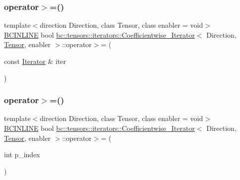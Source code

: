 \mbox{\label{structbc_1_1tensors_1_1iterators_1_1Coefficientwise__Iterator_a0030f0c39f8c92d9853d5ca7ea48d41d}} 
\subsubsection{\texorpdfstring{operator$>$=()}{operator>=()}\hspace{0.1cm}{\footnotesize\ttfamily [1/2]}}
{\footnotesize\ttfamily template$<$direction Direction, class Tensor, class enabler = void$>$ \\
\hyperlink{common_8h_a6699e8b0449da5c0fafb878e59c1d4b1}{B\+C\+I\+N\+L\+I\+NE} bool \hyperlink{structbc_1_1tensors_1_1iterators_1_1Coefficientwise__Iterator}{bc\+::tensors\+::iterators\+::\+Coefficientwise\+\_\+\+Iterator}$<$ Direction, \hyperlink{namespacebc_a659391e47ab612be3ba6c18cf9c89159}{Tensor}, enabler $>$\+::operator$>$= (\begin{DoxyParamCaption}\item[{const \hyperlink{structbc_1_1tensors_1_1iterators_1_1Coefficientwise__Iterator_a313f76f47e60a806035279a36a84f835}{Iterator} \&}]{iter }\end{DoxyParamCaption})\hspace{0.3cm}{\ttfamily [inline]}}

\mbox{\label{structbc_1_1tensors_1_1iterators_1_1Coefficientwise__Iterator_a895442b6aa0ea75aa9a48fb3a8e76e73}} 
\subsubsection{\texorpdfstring{operator$>$=()}{operator>=()}\hspace{0.1cm}{\footnotesize\ttfamily [2/2]}}
{\footnotesize\ttfamily template$<$direction Direction, class Tensor, class enabler = void$>$ \\
\hyperlink{common_8h_a6699e8b0449da5c0fafb878e59c1d4b1}{B\+C\+I\+N\+L\+I\+NE} bool \hyperlink{structbc_1_1tensors_1_1iterators_1_1Coefficientwise__Iterator}{bc\+::tensors\+::iterators\+::\+Coefficientwise\+\_\+\+Iterator}$<$ Direction, \hyperlink{namespacebc_a659391e47ab612be3ba6c18cf9c89159}{Tensor}, enabler $>$\+::operator$>$= (\begin{DoxyParamCaption}\item[{int}]{p\+\_\+index }\end{DoxyParamCaption})\hspace{0.3cm}{\ttfamily [inline]}}

